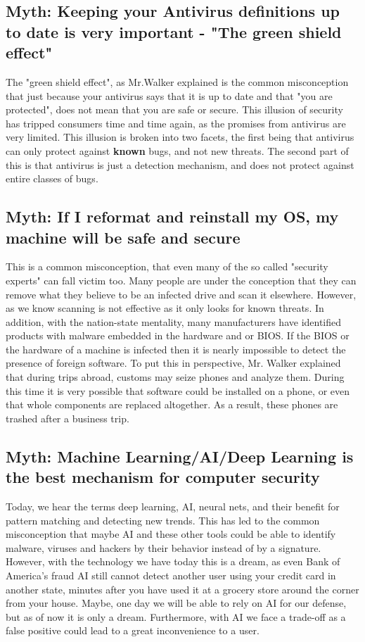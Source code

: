 \documentclass{article}
\newcommand\tab[1][1cm]{\hspace*{#1}}
\begin{document}
\subsection{Myth: Keeping your Antivirus definitions up to date is very important - "The green shield effect"}
\tab The "green shield effect", as Mr.Walker explained is the common misconception that just because your antivirus says that it is up to date and that "you are protected", does not mean that you are safe or secure. This illusion of security has tripped consumers time and time again, as the promises from antivirus are very limited. This illusion is broken into two facets, the first being that antivirus can only protect against \textbf{known} bugs, and not new threats. The second part of this is that antivirus is just a detection mechanism, and does not protect against entire classes of bugs.
\\
\subsection{Myth: If I reformat and reinstall my OS, my machine will be safe and secure}
\tab This is a common misconception, that even many of the so called "security experts" can fall victim too. Many people are under the conception that they can remove what they believe to be an infected drive and scan it elsewhere. However, as we know scanning is not effective as it only looks for known threats. In addition, with the nation-state mentality, many manufacturers have identified products with malware embedded in the hardware and or BIOS. If the BIOS or the hardware of a machine is infected then it is nearly impossible to detect the presence of foreign software. To put this in perspective, Mr. Walker explained that during trips abroad, customs may seize phones and analyze them. During this time it is very possible that software could be installed on a phone, or even that whole components are replaced altogether. As a result, these phones are trashed after a business trip.
\\
\subsection{Myth: Machine Learning/AI/Deep Learning is the best mechanism for computer security}
\tab Today, we hear the terms deep learning, AI, neural nets, and their benefit for pattern matching and detecting new trends. This has led to the common misconception that maybe AI and these other tools could be able to identify malware, viruses and hackers by their behavior instead of by a signature. However, with the technology we have today this is a dream, as even Bank of America's fraud AI still cannot detect another user using your credit card in another state, minutes after you have used it at a grocery store around the corner from your house. Maybe, one day we will be able to rely on AI for our defense, but as of now it is only a dream. Furthermore, with AI we face a trade-off as a false positive could lead to a great inconvenience to a user. 
\\
\end{document}
